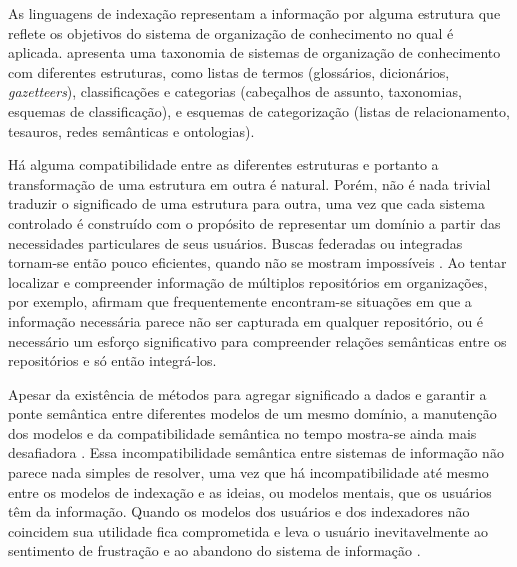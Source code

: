As linguagens de indexação representam a informação por alguma estrutura que reflete os objetivos do sistema de organização de conhecimento no qual é aplicada.  apresenta uma taxonomia de sistemas de organização de conhecimento com diferentes estruturas, como listas de termos (glossários, dicionários, \textit{gazetteers}), classificações e categorias (cabeçalhos de assunto, taxonomias, esquemas de classificação), e esquemas de categorização (listas de relacionamento, tesauros, redes semânticas e ontologias).

Há alguma compatibilidade entre as diferentes estruturas e portanto a transformação de uma estrutura em outra é natural. Porém, não é nada trivial traduzir o significado de uma estrutura para outra, uma vez que cada sistema controlado é construído com o propósito de representar um domínio a partir das necessidades particulares de seus usuários. Buscas federadas ou integradas tornam-se então pouco eficientes, quando não se mostram impossíveis \cite{halevy2005enterprise,hjorland2012google}. Ao tentar localizar e compreender informação de múltiplos repositórios em organizações, por exemplo,  afirmam que frequentemente encontram-se situações em que a informação necessária parece não ser capturada em qualquer repositório, ou é necessário um esforço significativo para compreender relações semânticas entre os repositórios e só então integrá-los. 

Apesar da existência de métodos para agregar significado a dados e garantir a ponte semântica entre diferentes modelos de um mesmo domínio, a manutenção dos modelos e da compatibilidade semântica no tempo mostra-se ainda mais desafiadora \cite{halevy2005enterprise}. Essa incompatibilidade semântica entre sistemas de informação não parece nada simples de resolver, uma vez que há incompatibilidade até mesmo entre os modelos de indexação e as ideias, ou modelos mentais, que os usuários têm da informação. Quando os modelos dos usuários e dos indexadores não coincidem sua utilidade fica comprometida e leva o usuário inevitavelmente ao sentimento de frustração e ao abandono do sistema de informação \cite{domainAnalysis1995,solomon2002}.

